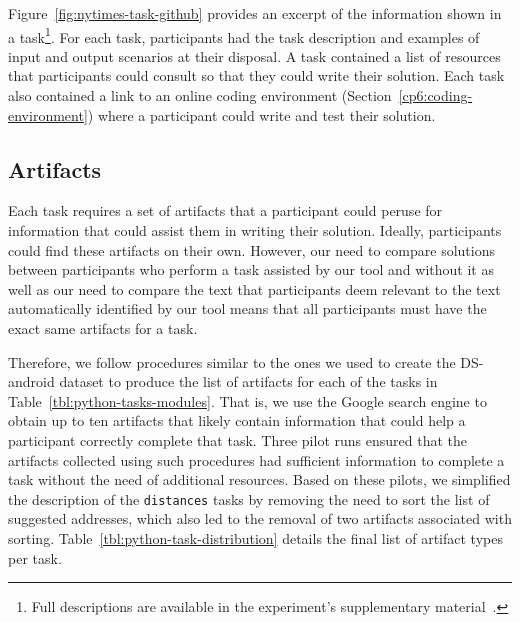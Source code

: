 Figure~\ref{fig:nytimes-task-github} provides an excerpt of the information shown in a task\footnote{Full descriptions are available in the experiment's supplementary material~\cite{cp6_supplementary_material}.}.
For each task, participants had the task description and examples of input and output scenarios at their disposal. A task contained a list of resources that participants could consult 
so that they could write their solution.
Each task also contained a link to an online coding environment (Section~\ref{cp6:coding-environment})
where a participant could write and test their solution. 










\subsection{Artifacts}
\label{cp6:experiment-artifacts}




Each task requires a set of artifacts that a participant could peruse for information that could assist them in writing their solution.
Ideally, participants could find these artifacts on their own. However, our need to compare solutions between participants who perform a task 
assisted by our tool and without it as well as our need to compare the text that participants deem relevant to the text
automatically identified by our tool means that all participants must have the exact same artifacts for a task.


Therefore,
we follow procedures similar to the ones we used to create the \acs{DS-android} dataset to produce the list of artifacts for each of the tasks in Table~\ref{tbl:python-tasks-modules}. 
That is, we use the Google search engine to obtain up to ten artifacts that likely contain 
information that could help a participant correctly complete that task. 
Three pilot runs ensured that the artifacts collected using such procedures had sufficient information to complete a task without 
the need of additional resources. Based on these pilots, we simplified the description of the \texttt{distances} tasks by removing the need to sort the list of suggested addresses, which also led to the removal of two artifacts associated with sorting. Table~\ref{tbl:python-task-distribution} details the final list 
of artifact types per task.





